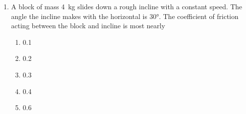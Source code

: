 \documentclass{../../../oss-classkick}
\begin{document}
\begin{multicols*}{2}
\begin{enumerate}[resume,leftmargin=18pt]
    
  \item A block of mass \SI{4}{\kilo\gram} slides down a rough incline with a
    constant speed. The angle the incline makes with the horizontal is
    \ang{30}. The coefficient of friction acting between the block and incline
    is most nearly
    \begin{center}
    \end{center}
    \begin{enumerate}[nosep,leftmargin=18pt,label=(\Alph*)]
    \item 0.1
    \item 0.2
    \item 0.3
    \item 0.4
    \item 0.6
    \end{enumerate}


\end{enumerate}
\end{multicols*}
\end{document}
